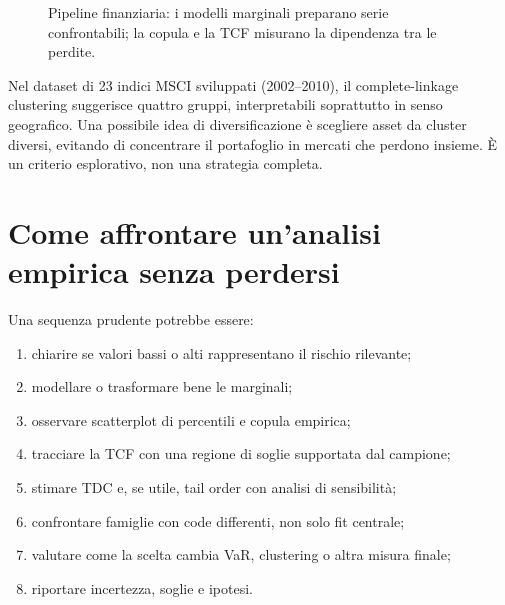 \documentclass[11pt,a4paper]{article}
\begin{document}
\begin{figure}[ht]
\centering
{}
\caption{Pipeline finanziaria: i modelli marginali preparano serie confrontabili; la copula e la TCF misurano la dipendenza tra le perdite.}
\label{fig:financial-pipeline}
\end{figure}

Nel dataset di 23 indici MSCI sviluppati (2002--2010), il complete-linkage
clustering suggerisce quattro gruppi, interpretabili soprattutto in senso
geografico. Una possibile idea di diversificazione è scegliere asset da
cluster diversi, evitando di concentrare il portafoglio in mercati che perdono
insieme. È un criterio esplorativo, non una strategia completa.

\section{Come affrontare un'analisi empirica senza perdersi}

Una sequenza prudente potrebbe essere:
\begin{enumerate}
  \item chiarire se valori bassi o alti rappresentano il rischio rilevante;
  \item modellare o trasformare bene le marginali;
  \item osservare scatterplot di percentili e copula empirica;
  \item tracciare la TCF con una regione di soglie supportata dal campione;
  \item stimare TDC e, se utile, tail order con analisi di sensibilità;
  \item confrontare famiglie con code differenti, non solo fit centrale;
  \item valutare come la scelta cambia VaR, clustering o altra misura finale;
  \item riportare incertezza, soglie e ipotesi.
\end{enumerate}
\end{document}
